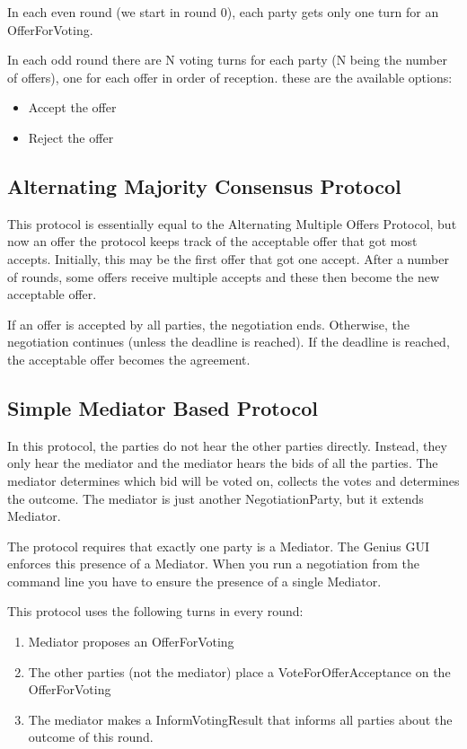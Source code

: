 \documentclass[]{article}
\newcommand\Genius{{\sc Genius}}
\begin{document}
In each even round (we start in round 0), each party gets only one turn for an OfferForVoting. 

In each odd round there are N voting turns for each party (N being the number of offers), one for each offer in order of reception. these are the available options:
\begin{itemize}
\item Accept the offer
\item Reject the offer
\end{itemize}


\subsection{Alternating Majority Consensus Protocol}

This protocol is essentially equal to the Alternating Multiple Offers Protocol, but now an offer the protocol keeps track of the acceptable offer that got most accepts.
Initially, this may be the first offer that got one accept. After a number of rounds, some offers receive multiple accepts and these then become the new acceptable offer.

If an offer is accepted by all parties, the negotiation ends. Otherwise, the negotiation continues (unless the deadline is reached). If the deadline is reached, the acceptable offer becomes the agreement.
 
 
\subsection{Simple Mediator Based Protocol}
In this protocol, the parties do not hear the other parties directly. Instead, they only hear the mediator and the mediator hears the bids of all the parties. The mediator determines which bid will be voted on, collects the votes and determines the outcome. The mediator is just another NegotiationParty, but it extends Mediator.

The protocol requires that exactly one party is a Mediator. The {\Genius} GUI enforces this presence of a Mediator. When you run a negotiation from the command line you have to ensure the presence of a single Mediator.

This protocol uses the following turns in every round:
\begin{enumerate}
\item Mediator proposes an OfferForVoting
\item The other parties (not the mediator) place a VoteForOfferAcceptance on the OfferForVoting
\item The mediator makes a InformVotingResult that informs all parties about the outcome of this round.
\end{enumerate}
\end{document}
